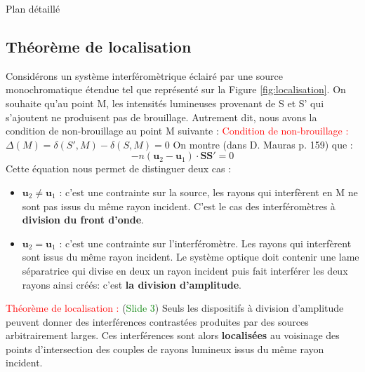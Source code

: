 \begin{reportBlock}{Plan détaillé}
  \subsection{Théorème de localisation}
  Considérons un système interféromètrique éclairé par une source monochromatique étendue tel que représenté sur la Figure \ref{fig:localisation}. On souhaite qu'au point M, les intensités lumineuses provenant de S et S' qui s'ajoutent ne produisent pas de brouillage. Autrement dit, nous avons la condition de non-brouillage au point M suivante :\newline
  \textcolor{red}{Condition de non-brouillage :} $\Delta(M)=\delta(S',M)-\delta(S,M)=0$ \newline
  On montre (dans D. Mauras p. 159) que :
  \begin{equation}
      -n(\mathbf{u}_2-\mathbf{u}_1)\cdot\mathbf{SS'}=0
  \end{equation}
  Cette équation nous permet de distinguer deux cas :
  \begin{itemize}
      \item $\mathbf{u}_2\ne\mathbf{u}_1$ : c'est une contrainte sur la source, les rayons qui interfèrent en M ne sont pas issus du même rayon incident. C'est le cas des interféromètres à \textbf{division du front d'onde}.
      \item $\mathbf{u}_2=\mathbf{u}_1$ : c'est une contrainte sur l'interféromètre. Les rayons qui interfèrent sont issus du même rayon incident. Le système optique doit contenir une lame séparatrice qui divise en deux un rayon incident puis fait interférer les deux rayons ainsi créés: c'est \textbf{la division d'amplitude}.
  \end{itemize}
  \textcolor{red}{Théorème de localisation :} (\textcolor{green}{Slide 3}) Seuls les dispositifs à division d'amplitude peuvent donner des interférences contrastées produites par des sources arbitrairement larges. Ces interférences sont alors \textbf{localisées} au voisinage des points d'intersection des couples de rayons lumineux issus du même rayon incident.
  

\end{reportBlock}
